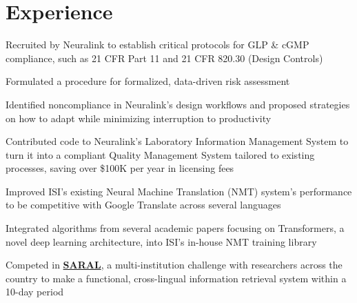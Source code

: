 \documentclass[letterpaper]{deedy-resume} %
\begin{document}
\begin{minipage}[t]{0.66\textwidth} %


\section{Experience}

\vspace{\topsep} %
\vspace{\topsep}

\begin{tightitemize}
\item Recruited by Neuralink to establish critical protocols for GLP \& cGMP compliance, such as 21 CFR Part 11 and 21 CFR 820.30 (Design Controls)
\item Formulated a procedure for formalized, data-driven risk assessment
\item Identified noncompliance in Neuralink's design workflows and proposed strategies on how to adapt while minimizing interruption to productivity
\item Contributed code to Neuralink's Laboratory Information Management System to turn it into a compliant Quality Management System tailored to existing processes, saving over \$100K per year in licensing fees
\end{tightitemize}

\sectionspace %


\vspace{\topsep}

\begin{tightitemize}
\item Improved ISI's existing Neural Machine Translation (NMT) system’s performance to be competitive with Google Translate across several languages
\item Integrated algorithms from several academic papers focusing on Transformers, a novel deep learning architecture, into ISI’s in-house NMT training library 
\item Competed in \href{https://viterbischool.usc.edu/news/2018/01/usc-isi-develop-translation-information-retrieval-system-uncommon-languages/}{\bf SARAL}, a multi-institution challenge with researchers across the country to make a functional, cross-lingual information retrieval system within a 10-day period


\end{tightitemize}
\end{minipage}
\end{document}
